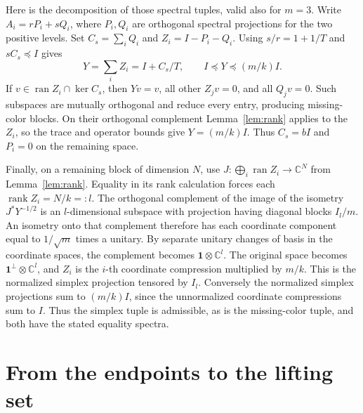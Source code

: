 \documentclass[11pt]{article}
\newcommand{\rank}{\operatorname{rank}}
\newcommand{\ran}{\operatorname{ran}}
\begin{document}
Here is the decomposition of those spectral tuples, valid also for
\(m=3\). Write \(A_i=rP_i+sQ_i\), where \(P_i,Q_i\) are
orthogonal spectral projections for the two positive levels. Set
\(C_s=\sum_iQ_i\) and \(Z_i=I-P_i-Q_i\). Using \(s/r=1+1/T\)
and \(sC_s\preceq I\) gives
\[
Y=\sum_i Z_i=I+C_s/T,\qquad I\preceq Y\preceq (m/k)I .
\]
If \(v\in\ran Z_i\cap\ker C_s\), then \(Yv=v\), all other \(Z_jv=0\),
and all \(Q_jv=0\). Such subspaces are mutually orthogonal
and reduce every entry, producing missing-color blocks.
On their orthogonal complement Lemma~\ref{lem:rank} applies
to the \(Z_i\), so the trace and operator bounds give \(Y=(m/k)I\).
Thus \(C_s=bI\) and \(P_i=0\) on the remaining space.

Finally, on a remaining block of dimension \(N\), use
\(J:\bigoplus_i\ran Z_i\to\mathbb C^N\) from
Lemma~\ref{lem:rank}. Equality in its rank calculation forces
each \(\rank Z_i=N/k=:l\). The orthogonal complement of
the image of the isometry \(J^*Y^{-1/2}\) is an \(l\)-dimensional
subspace with projection having diagonal blocks \(I_l/m\).
An isometry onto that complement therefore has each coordinate
component equal to \(1/\sqrt m\) times a unitary. By separate
unitary changes of basis in the coordinate spaces, the complement
becomes \(\mathbf 1\otimes\mathbb C^l\). The original space
becomes \(\mathbf 1^\perp\otimes\mathbb C^l\), and \(Z_i\)
is the \(i\)-th coordinate compression multiplied by \(m/k\).
This is the normalized simplex projection tensored by \(I_l\).
Conversely the normalized simplex projections sum to \((m/k)I\),
since the unnormalized coordinate compressions sum to \(I\).
Thus the simplex tuple is admissible, as is the missing-color tuple,
and both have the stated equality spectra.

\section{From the endpoints to the lifting set}\label{sec:set}
\end{document}
